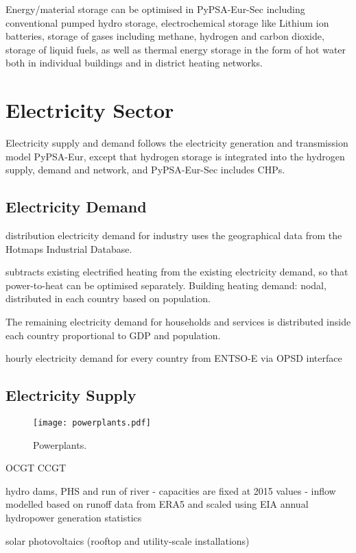 Energy/material storage can be optimised in PyPSA-Eur-Sec including conventional
pumped hydro storage, electrochemical storage like Lithium ion batteries,
storage of gases including methane, hydrogen and carbon dioxide, storage of
liquid fuels, as well as thermal energy storage in the form of hot water both in
individual buildings and in district heating networks.

\section{Electricity Sector}

Electricity supply and demand follows the electricity generation and
transmission model PyPSA-Eur, except that hydrogen storage is integrated into
the hydrogen supply, demand and network, and PyPSA-Eur-Sec includes CHPs.


\subsection{Electricity Demand}

distribution electricity demand for
industry uses the geographical data from
the Hotmaps Industrial Database.

subtracts existing electrified heating from
the existing electricity demand, so that power-to-heat can be optimised
separately.
Building heating demand: nodal, distributed in each country based on population.

The remaining electricity demand for households and services is distributed
inside each country proportional to GDP and population.

hourly electricity demand for every country from ENTSO-E via OPSD interface

\subsection{Electricity Supply}

\begin{SCfigure}
    \texttt{[image: powerplants.pdf]}
    \caption{Powerplants.}
\end{SCfigure}

OCGT CCGT

hydro dams, PHS and run of river
- capacities are fixed at 2015 values
- inflow modelled based on runoff data from ERA5 and scaled using EIA annual hydropower generation statistics

solar photovoltaics (rooftop and utility-scale installations)

